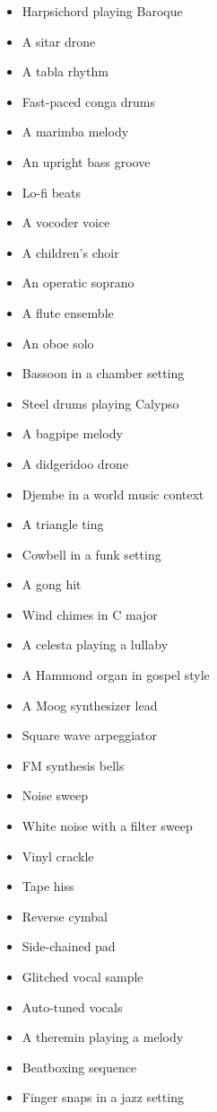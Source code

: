 \documentclass[
  a4paper,  %
  twoside,  %
  bibliography=totoc,
  headsepline,
  cleardoublepage=empty,
  parskip=half,
  draft=false
]{scrbook}
\begin{document}
\begin{multicols}{4}
\begin{itemize}
    \item Harpsichord playing Baroque
    \item A sitar drone
    \item A tabla rhythm
    \item Fast-paced conga drums
    \item A marimba melody
    \item An upright bass groove
    \item Lo-fi beats
    \item A vocoder voice
    \item A children's choir
    \item An operatic soprano
    \item A flute ensemble
    \item An oboe solo
    \item Bassoon in a chamber setting
    \item Steel drums playing Calypso
    \item A bagpipe melody
    \item A didgeridoo drone
    \item Djembe in a world music context
    \item A triangle ting
    \item Cowbell in a funk setting
    \item A gong hit
    \item Wind chimes in C major
    \item A celesta playing a lullaby
    \item A Hammond organ in gospel style
    \item A Moog synthesizer lead
    \item Square wave arpeggiator
    \item FM synthesis bells
    \item Noise sweep
    \item White noise with a filter sweep
    \item Vinyl crackle
    \item Tape hiss
    \item Reverse cymbal
    \item Side-chained pad
    \item Glitched vocal sample
    \item Auto-tuned vocals
    \item A theremin playing a melody
    \item Beatboxing sequence
    \item Finger snaps in a jazz setting

\end{itemize}
\end{multicols}
\end{document}
